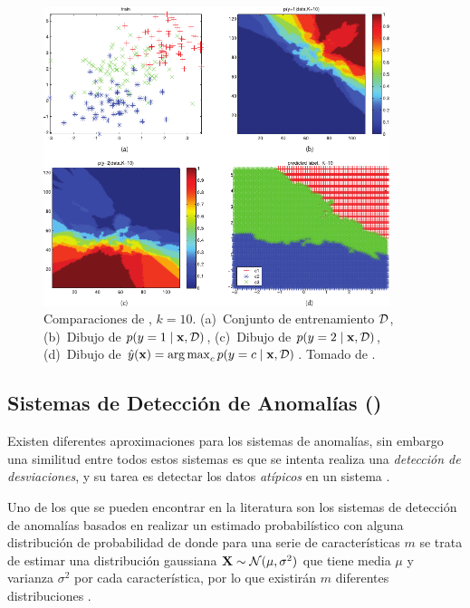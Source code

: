 \begin{figure}[H]
   \centering
   \includegraphics[width=0.9\textwidth]{Figures/knn-comparisons.pdf}
   \decoRule
   \caption[Comparaciones de \textsl{}]{Comparaciones de \textsl{}, $k=10$. (a)~Conjunto de entrenamiento $\mathcal{D}$, (b)~Dibujo de $p(y=1 \mid {\mathbf{x}}, \mathcal{D})$, (c)~Dibujo de $p(y=2 \mid {\mathbf{x}}, \mathcal{D})$, (d)~Dibujo de $\hat{y}({\mathbf{x}}) = \operatorname*{arg\,max}_{c} p(y=c \mid {\mathbf{x}}, \mathcal{D})$. Tomado de \cite{murphymachinel}.}
   \label{fig:knn-comparisons}
\end{figure}


\subsection{Sistemas de Detección de Anomalías ()}
Existen diferentes aproximaciones para los sistemas de anomalías, sin embargo una similitud entre todos estos sistemas es que se intenta realiza una \emph{detección de desviaciones}, y su tarea es detectar los datos \emph{atípicos} en un sistema \cite{tan2005introduction}.

Uno de los que se pueden encontrar en la literatura son los sistemas de detección de anomalías basados en realizar un estimado probabilístico con alguna distribución de probabilidad de donde para una serie de características $m$ se trata de estimar una distribución gaussiana ${\mathbf{X}} \sim \mathcal{N}(\mu, \sigma^2)$ que tiene media $\mu$ y varianza $\sigma^2$ por cada característica, por lo que existirán $m$ diferentes distribuciones .

